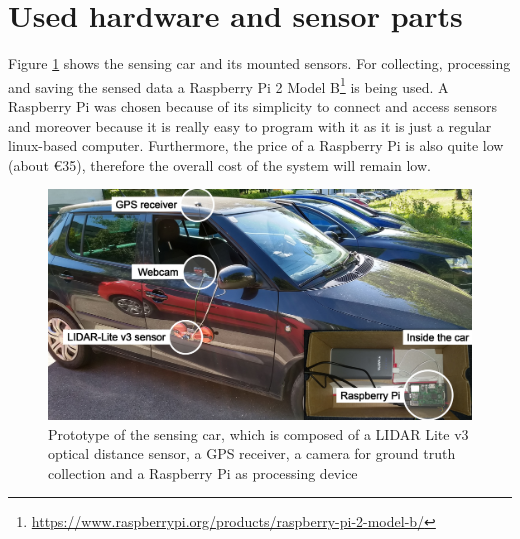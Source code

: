 %
%
%









\section{Used hardware and sensor parts}
\label{sec:test_bed}

Figure \ref{fig:sensing_car} shows the sensing car and its mounted sensors. For collecting, processing and saving the sensed data a Raspberry Pi 2 Model B\footnote{\url{https://www.raspberrypi.org/products/raspberry-pi-2-model-b/}} is being used. A Raspberry Pi was chosen because of its simplicity to connect and access sensors and moreover because it is really easy to program with it as it is just a regular linux-based computer. Furthermore, the price of a Raspberry Pi is also quite low (about \euro{35}), therefore the overall cost of the system will remain low.


\begin{figure}
	\centering
	\includegraphics[width=\textwidth]{img/car.jpg}
	\caption{Prototype of the sensing car, which is composed of a LIDAR Lite v3 optical distance sensor, a GPS receiver, a camera for ground truth collection and a Raspberry Pi as processing device}
	\label{fig:sensing_car}
\end{figure}


